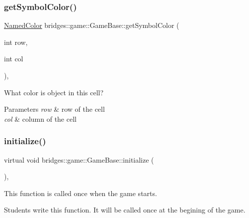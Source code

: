 \subsubsection{\texorpdfstring{getSymbolColor()}{getSymbolColor()}}
{\footnotesize\ttfamily \mbox{\hyperlink{namespacebridges_1_1game_afaa832a4322b25b6a4ebfba832f10f26}{Named\+Color}} bridges\+::game\+::\+Game\+Base\+::get\+Symbol\+Color (\begin{DoxyParamCaption}\item[{int}]{row,  }\item[{int}]{col }\end{DoxyParamCaption})\hspace{0.3cm}{\ttfamily [inline]}, {\ttfamily [protected]}}



What color is object in this cell? 


\begin{DoxyParams}{Parameters}
{\em row} & row of the cell \\
\hline
{\em col} & column of the cell \\
\hline
\end{DoxyParams}
\mbox{\label{classbridges_1_1game_1_1_game_base_a9b6eb6fa7fceaac09d204b549164037f}} 
\subsubsection{\texorpdfstring{initialize()}{initialize()}}
{\footnotesize\ttfamily virtual void bridges\+::game\+::\+Game\+Base\+::initialize (\begin{DoxyParamCaption}{ }\end{DoxyParamCaption})\hspace{0.3cm}{\ttfamily [protected]}, {}}



This function is called once when the game starts. 

Students write this function. It will be called once at the begining of the game. \mbox{\label{classbridges_1_1game_1_1_game_base_a78d8bdc86cf7c5aba6a75879be1b6140}} 
